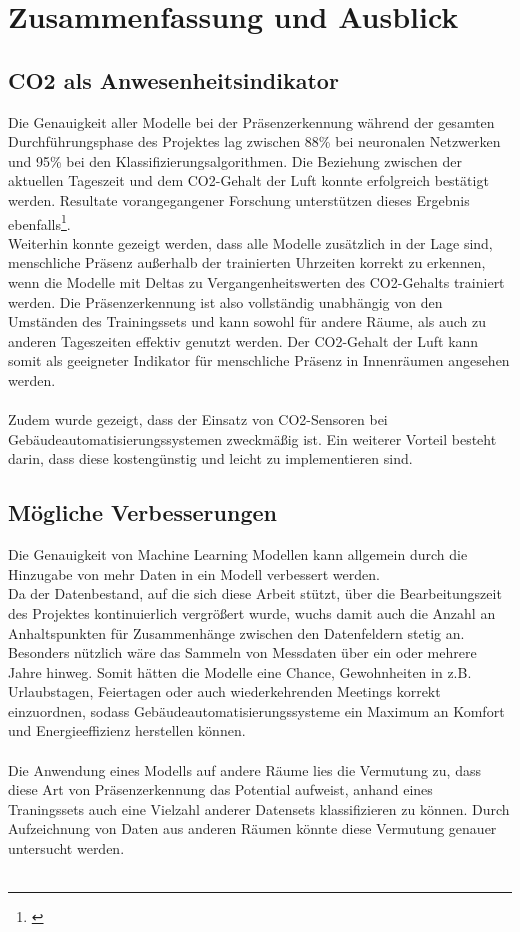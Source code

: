 \clearpage
\chapter{\textbf{Zusammenfassung und Ausblick}}\label{zusammenfassung}

\section{CO2 als Anwesenheitsindikator}
Die Genauigkeit aller Modelle bei der Präsenzerkennung während der gesamten Durchführungsphase des Projektes 
lag zwischen 88\% bei neuronalen Netzwerken und 95\% bei den Klassifizierungsalgorithmen. 
Die Beziehung zwischen der aktuellen Tageszeit und dem CO2-Gehalt der Luft konnte erfolgreich bestätigt 
werden. Resultate vorangegangener Forschung unterstützen dieses Ergebnis ebenfalls\footnote[1]{\cite{IPPR}}.\\
Weiterhin konnte gezeigt werden, dass alle Modelle zusätzlich in der Lage sind, menschliche Präsenz außerhalb
der trainierten Uhrzeiten korrekt zu erkennen, wenn die Modelle mit Deltas zu Vergangenheitswerten des 
CO2-Gehalts trainiert werden. Die Präsenzerkennung ist also vollständig unabhängig von den Umständen des
Trainingssets und kann sowohl für andere Räume, als auch zu anderen Tageszeiten effektiv genutzt werden. 
Der CO2-Gehalt der Luft kann somit als geeigneter Indikator für menschliche Präsenz in Innenräumen angesehen 
werden.\\\\
Zudem wurde gezeigt, dass der Einsatz von CO2-Sensoren bei Gebäudeautomatisierungssystemen zweckmäßig ist.
Ein weiterer Vorteil besteht darin, dass diese kostengünstig und leicht zu implementieren sind.


\section{Mögliche Verbesserungen}
Die Genauigkeit von Machine Learning Modellen kann allgemein durch die Hinzugabe von mehr Daten in ein Modell 
verbessert werden. \\
Da der Datenbestand, auf die sich diese Arbeit stützt, über die Bearbeitungszeit des Projektes 
kontinuierlich vergrößert wurde, wuchs damit auch die Anzahl an Anhaltspunkten für Zusammenhänge zwischen den 
Datenfeldern stetig an. Besonders nützlich wäre das Sammeln von Messdaten über ein oder mehrere Jahre hinweg.
Somit hätten die Modelle eine Chance, Gewohnheiten in z.B. Urlaubstagen, Feiertagen oder auch wiederkehrenden
Meetings korrekt einzuordnen, sodass Gebäudeautomatisierungssysteme ein Maximum an Komfort und Energieeffizienz
herstellen können.\\\\
Die Anwendung eines Modells auf andere Räume lies die Vermutung zu, dass diese Art von Präsenzerkennung das 
Potential aufweist, anhand eines Traningssets auch eine Vielzahl anderer Datensets klassifizieren zu können.
Durch Aufzeichnung von Daten aus anderen Räumen könnte diese Vermutung genauer untersucht werden.  \\\\

